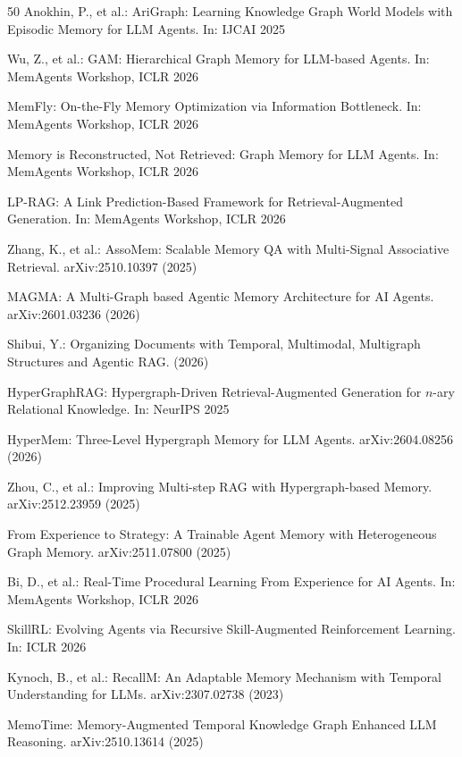 \documentclass[hf]{ceurart}
\begin{document}
\begin{thebibliography}{50}
Anokhin, P., et al.: AriGraph: Learning Knowledge Graph World Models
with Episodic Memory for LLM Agents. In: IJCAI 2025

Wu, Z., et al.: GAM: Hierarchical Graph Memory for LLM-based
Agents. In: MemAgents Workshop, ICLR 2026

MemFly: On-the-Fly Memory Optimization via Information Bottleneck.
In: MemAgents Workshop, ICLR 2026

Memory is Reconstructed, Not Retrieved: Graph Memory for LLM Agents.
In: MemAgents Workshop, ICLR 2026

LP-RAG: A Link Prediction-Based Framework for Retrieval-Augmented
Generation. In: MemAgents Workshop, ICLR 2026

Zhang, K., et al.: AssoMem: Scalable Memory QA with Multi-Signal
Associative Retrieval. arXiv:2510.10397 (2025)

MAGMA: A Multi-Graph based Agentic Memory Architecture for AI
Agents. arXiv:2601.03236 (2026)

Shibui, Y.: Organizing Documents with Temporal, Multimodal,
Multigraph Structures and Agentic RAG. (2026)

HyperGraphRAG: Hypergraph-Driven Retrieval-Augmented Generation for
$n$-ary Relational Knowledge. In: NeurIPS 2025

HyperMem: Three-Level Hypergraph Memory for LLM Agents.
arXiv:2604.08256 (2026)

Zhou, C., et al.: Improving Multi-step RAG with Hypergraph-based
Memory. arXiv:2512.23959 (2025)

From Experience to Strategy: A Trainable Agent Memory with
Heterogeneous Graph Memory. arXiv:2511.07800 (2025)

Bi, D., et al.: Real-Time Procedural Learning From Experience for
AI Agents. In: MemAgents Workshop, ICLR 2026

SkillRL: Evolving Agents via Recursive Skill-Augmented Reinforcement
Learning. In: ICLR 2026

Kynoch, B., et al.: RecallM: An Adaptable Memory Mechanism with
Temporal Understanding for LLMs. arXiv:2307.02738 (2023)

MemoTime: Memory-Augmented Temporal Knowledge Graph Enhanced LLM
Reasoning. arXiv:2510.13614 (2025)


\end{thebibliography}
\end{document}
